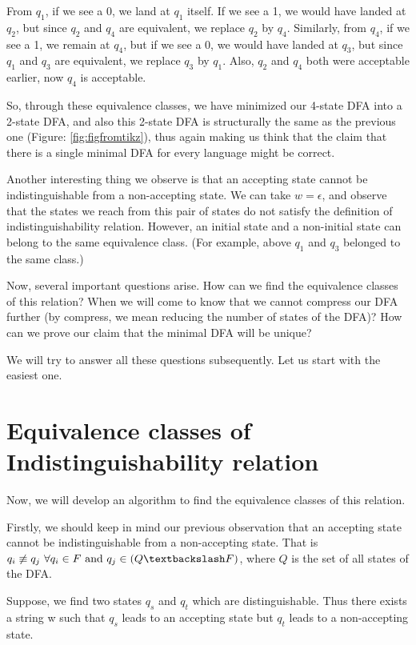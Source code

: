 \documentclass[english, 11pt]{article}
\begin{document}
From $q_1$, if we see a 0, we land at $q_1$ itself. If we see a 1, we would have landed at $q_2$, but since $q_2$ and $q_4$ are equivalent, we replace $q_2$ by $q_4$. Similarly, from $q_4$, if we see a 1, we remain at $q_4$, but if we see a 0, we would have landed at $q_3$, but since $q_1$ and $q_3$ are equivalent, we replace $q_3$ by $q_1$. Also, $q_2$ and $q_4$ both were acceptable earlier, now $q_4$ is acceptable. 


So, through these equivalence classes, we have minimized our 4-state DFA into a 2-state DFA, and also this 2-state DFA is structurally the same as the previous one (Figure: \ref{fig:figfromtikz}), thus again making us think that the claim that there is a single minimal DFA for every language might be correct. 


Another interesting thing we observe is that an accepting state cannot be indistinguishable from a non-accepting state. We can take $w = \epsilon$, and observe that the states we reach from this pair of states do not satisfy the definition of indistinguishability relation. However, an initial state and a non-initial state can belong to the same equivalence class. (For example, above $q_1$ and $q_3$ belonged to the same class.)


Now, several important questions arise. How can we find the equivalence classes of this relation? When we will come to know that we cannot compress our DFA further (by compress, we mean reducing the number of states of the DFA)? How can we prove our claim that the minimal DFA will be unique?


We will try to answer all these questions subsequently. Let us start with the easiest one.


\section{Equivalence classes of Indistinguishability relation}
Now, we will develop an algorithm to find the equivalence classes of this relation.


Firstly, we should keep in mind our previous observation that an accepting state cannot be indistinguishable from a non-accepting state. That is $q_i \not\equiv q_j \text{ }\forall q_i \in F \text{ and } q_j \in (Q\textbackslash F)$, where $Q$ is the set of all states of the DFA. 


Suppose, we find two states $q_s$ and $q_t$ which are distinguishable. Thus there exists a string w such that $q_s$ leads to an accepting state but $q_t$ leads to a non-accepting state. 
\end{document}
